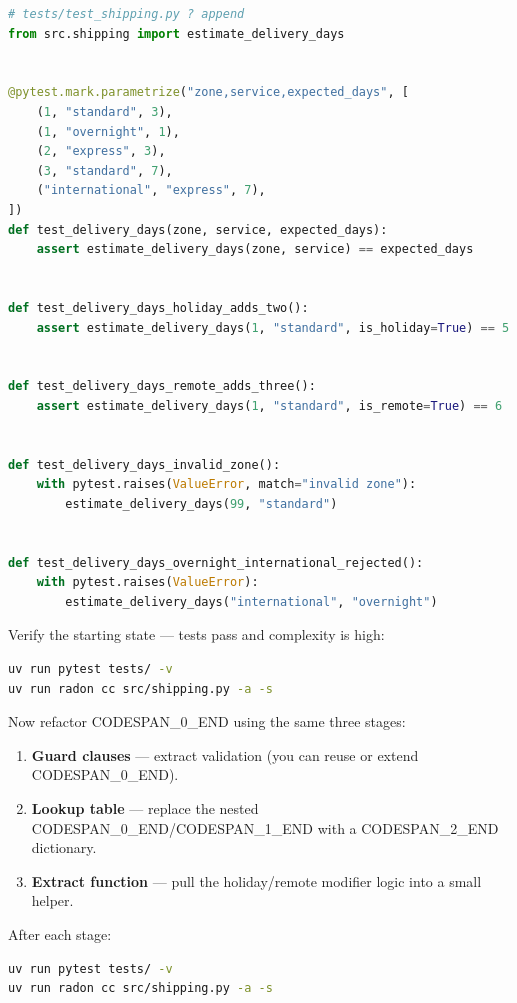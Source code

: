 \documentclass[11pt,a4paper]{book}
\begin{document}
\begin{lstlisting}[language=Python]
# tests/test_shipping.py ? append
from src.shipping import estimate_delivery_days


@pytest.mark.parametrize("zone,service,expected_days", [
    (1, "standard", 3),
    (1, "overnight", 1),
    (2, "express", 3),
    (3, "standard", 7),
    ("international", "express", 7),
])
def test_delivery_days(zone, service, expected_days):
    assert estimate_delivery_days(zone, service) == expected_days


def test_delivery_days_holiday_adds_two():
    assert estimate_delivery_days(1, "standard", is_holiday=True) == 5


def test_delivery_days_remote_adds_three():
    assert estimate_delivery_days(1, "standard", is_remote=True) == 6


def test_delivery_days_invalid_zone():
    with pytest.raises(ValueError, match="invalid zone"):
        estimate_delivery_days(99, "standard")


def test_delivery_days_overnight_international_rejected():
    with pytest.raises(ValueError):
        estimate_delivery_days("international", "overnight")
\end{lstlisting}

Verify the starting state --- tests pass and complexity is high:

\begin{lstlisting}[language=Bash]
uv run pytest tests/ -v
uv run radon cc src/shipping.py -a -s
\end{lstlisting}

Now refactor CODESPAN\_0\_END using the same three stages:

\begin{enumerate}
  \item \textbf{Guard clauses} --- extract validation (you can reuse or extend CODESPAN\_0\_END).
  \item \textbf{Lookup table} --- replace the nested CODESPAN\_0\_END/CODESPAN\_1\_END with a CODESPAN\_2\_END dictionary.
  \item \textbf{Extract function} --- pull the holiday/remote modifier logic into a small helper.
\end{enumerate}

After each stage:

\begin{lstlisting}[language=Bash]
uv run pytest tests/ -v
uv run radon cc src/shipping.py -a -s
\end{lstlisting}
\end{document}
